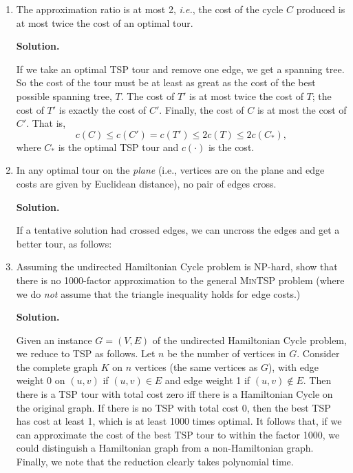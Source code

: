 \documentclass[2pt]{scrartcl}
\newcommand\solution{\textbf{Solution.}}
\begin{document}
\begin{multicols}{6}
\begin{enumerate}
\solution

This is true by construction.  The Eulerian tour $T$ visits every
vertex and so $T'$, $C'$, and $C$ visit every vertex.  (Note that $C$
visits every node because we only skip a vertex $v$ in $C'$ if $v$ had
already appeared in $C$.)  And $C$ skips already-visited vertices, so
$C$ visits each vertex exactly once.

\item The approximation ratio is at most 2, {\em i.e.}, the cost of
  the cycle $C$ produced is at most twice the cost of an optimal tour.

\solution

If we take an optimal TSP tour and remove one edge, we get a spanning
tree.  So the cost of the tour must be at least as great as the cost
of the best possible spanning tree, $T$.  The cost of $T'$ is at most
twice the cost of $T$; the cost of $T'$ is exactly the cost of $C'$.
Finally, the cost of $C$ is at most the cost of $C'$.  That is,
\[c(C)\le c(C')=c(T')\le 2c(T)\le 2c(C_*),\]
where $C_*$ is the optimal TSP tour and $c(\cdot)$ is the cost.

\item In any optimal tour on the {\em plane} (i.e., vertices are on
  the plane and edge costs are given by Euclidean distance), no pair
  of edges cross.

\solution

If a tentative solution had crossed edges, we can uncross the edges
and get a better tour, as follows:

\vspace*{2in}

\item Assuming the undirected Hamiltonian Cycle problem is NP-hard,
  show that there is no 1000-factor approximation to the general
  \textsc{MinTSP} problem (where we do {\em not} assume that the
  triangle inequality holds for edge costs.)

\solution

Given an instance $G=(V,E)$ of the undirected Hamiltonian Cycle
problem, we reduce to TSP as follows.  Let $n$ be the number of
vertices in $G$.  Consider the complete graph $K$ on $n$ vertices (the
same vertices as $G$), with edge weight 0 on $(u,v)$ if $(u,v)\in E$
and edge weight 1 if $(u,v)\not\in E$.  Then there is a TSP tour with
total cost zero iff there is a Hamiltonian Cycle on the original
graph.  If there is no TSP with total cost 0, then the best TSP has
cost at least 1, which is at least 1000 times optimal.  It follows
that, if we can approximate the cost of the best TSP tour to within
the factor 1000, we could distinguish a Hamiltonian graph from a
non-Hamiltonian graph.  Finally, we note that the reduction clearly
takes polynomial time.


\end{enumerate}
\end{multicols}
\end{document}
